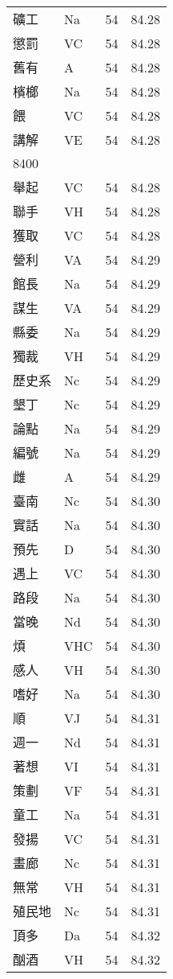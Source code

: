 \documentclass[twocolumn]{book}
\begin{document}
\begin{supertabular}{llrr}
礦工 & Na & 54 &  84.28\\
懲罰 & VC & 54 &  84.28\\
舊有 & A & 54 &  84.28\\
檳榔 & Na & 54 &  84.28\\
餵 & VC & 54 &  84.28\\
講解 & VE & 54 &  84.28\\
8400\\
舉起 & VC & 54 &  84.28\\
聯手 & VH & 54 &  84.28\\
獲取 & VC & 54 &  84.28\\
營利 & VA & 54 &  84.29\\
館長 & Na & 54 &  84.29\\
謀生 & VA & 54 &  84.29\\
縣委 & Na & 54 &  84.29\\
獨裁 & VH & 54 &  84.29\\
歷史系 & Nc & 54 &  84.29\\
墾丁 & Nc & 54 &  84.29\\
論點 & Na & 54 &  84.29\\
編號 & Na & 54 &  84.29\\
雌 & A & 54 &  84.29\\
臺南 & Nc & 54 &  84.30\\
實話 & Na & 54 &  84.30\\
預先 & D & 54 &  84.30\\
遇上 & VC & 54 &  84.30\\
路段 & Na & 54 &  84.30\\
當晚 & Nd & 54 &  84.30\\
煩 & VHC & 54 &  84.30\\
感人 & VH & 54 &  84.30\\
嗜好 & Na & 54 &  84.30\\
順 & VJ & 54 &  84.31\\
週一 & Nd & 54 &  84.31\\
著想 & VI & 54 &  84.31\\
策劃 & VF & 54 &  84.31\\
童工 & Na & 54 &  84.31\\
發揚 & VC & 54 &  84.31\\
畫廊 & Nc & 54 &  84.31\\
無常 & VH & 54 &  84.31\\
殖民地 & Nc & 54 &  84.31\\
頂多 & Da & 54 &  84.32\\
酗酒 & VH & 54 &  84.32\\

\end{supertabular}
\end{document}
